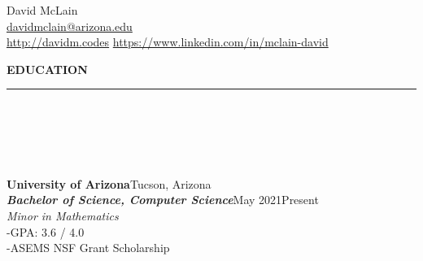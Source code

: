 \documentclass[10pt]{book}
\author{David McLain}
\begin{document}
    {
        \selectfont
        {\centering
            {
                \fontsize{13}{13}
                \selectfont David McLain
                \\
            }
            {
                \fontsize{12}{12}
                \selectfont
                \href{mailto:davidmclain@arizona.edu}{davidmclain@arizona.edu}
                \\
                \href{http://davidm.codes}{http://davidm.codes}
                \hspace{1pt}\textbar\hspace{1pt}
                \href{https://www.linkedin.com/in/mclain-david}{https://www.linkedin.com/in/mclain-david}
                \\
            }
        }
        \begin{spacing}{0.2}
            \noindent\fontsize{12}{12}
            \selectfont\hspace{-3pt}\textbf{EDUCATION}
            \\
            \rule{\linewidth}{0.4pt}
            \\
            \\
            \\
            \\
        \end{spacing}
        {
            \fontsize{11}{11}
            \selectfont
            \noindent\textbf{University of Arizona}\hfill Tucson, Arizona
            \\
            \textbf{\textit{Bachelor of Science, Computer Science}}\hfill May 2021\hspace{3pt}\textendash\hspace{3pt}Present
            \\
        }
        \textit{Minor in Mathematics}
        \\
        \hspace{2pt}-\hspace{6pt}GPA: 3.6 / 4.0
        \\
        \hspace{2pt}-\hspace{6pt}ASEMS NSF Grant Scholarship
        \\
}
\end{document}
